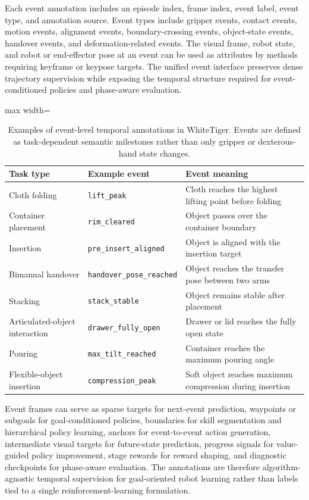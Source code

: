 Each event annotation includes an episode index, frame index, event label, event type, and annotation source. Event types include gripper events, contact events, motion events, alignment events, boundary-crossing events, object-state events, handover events, and deformation-related events. The visual frame, robot state, and robot or end-effector pose at an event can be used as attributes by methods requiring keyframe or keypose targets. The unified event interface preserves dense trajectory supervision while exposing the temporal structure required for event-conditioned policies and phase-aware evaluation.

\begin{table}[t]
\centering
\caption{Examples of event-level temporal annotations in WhiteTiger. Events are defined as task-dependent semantic milestones rather than only gripper or dexterous-hand state changes.}
\label{tab:event-keyframe-examples}
\footnotesize
\setlength{\tabcolsep}{4pt}
\renewcommand{\arraystretch}{1.08}
\begin{adjustbox}{max width=\textwidth}
\begin{tabular}{lll}
\toprule
Task type & Example event & Event meaning \\
\midrule
Cloth folding & \texttt{lift\_peak} & Cloth reaches the highest lifting point before folding \\
Container placement & \texttt{rim\_cleared} & Object passes over the container boundary \\
Insertion & \texttt{pre\_insert\_aligned} & Object is aligned with the insertion target \\
Bimanual handover & \texttt{handover\_pose\_reached} & Object reaches the transfer pose between two arms \\
Stacking & \texttt{stack\_stable} & Object remains stable after placement \\
Articulated-object interaction & \texttt{drawer\_fully\_open} & Drawer or lid reaches the fully open state \\
Pouring & \texttt{max\_tilt\_reached} & Container reaches the maximum pouring angle \\
Flexible-object insertion & \texttt{compression\_peak} & Soft object reaches maximum compression during insertion \\
\bottomrule
\end{tabular}
\end{adjustbox}
\end{table}

Event frames can serve as sparse targets for next-event prediction, waypoints or subgoals for goal-conditioned policies, boundaries for skill segmentation and hierarchical policy learning, anchors for event-to-event action generation, intermediate visual targets for future-state prediction, progress signals for value-guided policy improvement, stage rewards for reward shaping, and diagnostic checkpoints for phase-aware evaluation. The annotations are therefore algorithm-agnostic temporal supervision for goal-oriented robot learning rather than labels tied to a single reinforcement-learning formulation.

